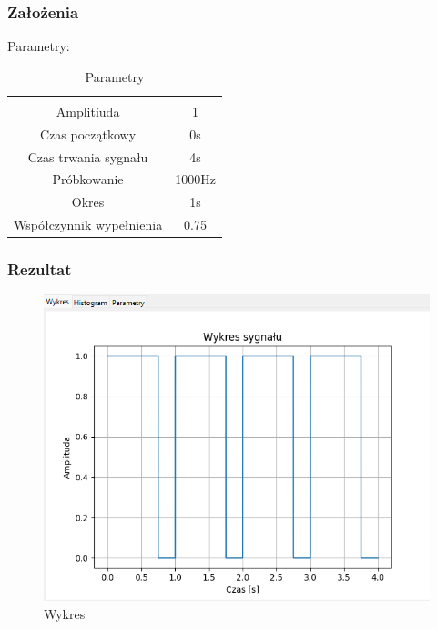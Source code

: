 \documentclass{article}
\begin{document}
\subsubsection{Założenia}
\noindent
Parametry:
\begin{table}[h!]
    \centering
    \vspace{0.2cm}
    \begin{tabular}{|c|c|}
        \hline\hline\\[-0.4cm]
        Amplitiuda & 1  \\
        \hline
        Czas początkowy & 0s  \\
        \hline
        Czas trwania sygnału & 4s  \\
        \hline
        Próbkowanie & 1000Hz \\
        \hline
        Okres & 1s\\
        \hline
        Współczynnik wypełnienia & 0.75\\
        \hline
    \end{tabular}
    \caption{Parametry}
    \label{prostokat}
\end{table}
\subsubsection{Rezultat}
\begin{figure}[h!]
    \centering
    \includegraphics[width=\textwidth]{img/prostokat/wykres.png}
    \caption{Wykres}
\end{figure}
\end{document}

